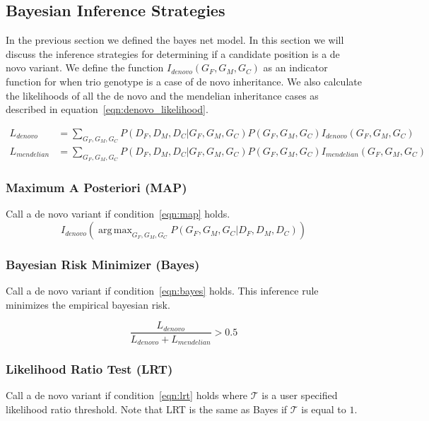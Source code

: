 \documentclass{article}
\DeclareMathOperator*{\argmax}{arg\,max}
\begin{document}
\subsection{Bayesian Inference Strategies}
In the previous section we defined the bayes net model. In this section we will discuss the inference strategies for determining if a candidate position is a de novo variant. We define the function $I_{denovo}(G_F,G_M,G_C)$ as an indicator function for when trio genotype is a case of de novo inheritance. We also calculate the likelihoods of all the de novo and the mendelian inheritance cases as described in equation~\ref{eqn:denovo_likelihood}.

\begin{align*}
\label{eqn:denovo_likelihood}
L_{denovo} &= \sum_{G_F,G_M,G_C}P(D_F,D_M,D_C|G_F,G_M,G_C)P(G_F,G_M,G_C)I_{denovo}(G_F,G_M,G_C)\\
L_{mendelian} &= \sum_{G_F,G_M,G_C}P(D_F,D_M,D_C|G_F,G_M,G_C)P(G_F,G_M,G_C)I_{mendelian}(G_F,G_M,G_C)
\end{align*}

\vspace{1em}
\subsubsection{Maximum A Posteriori (MAP)} 
Call a de novo variant if condition~\ref{eqn:map} holds.
\begin{equation}
\label{eqn:map}
I_{denovo}(\argmax_{G_F,G_M,G_C} P(G_F,G_M,G_C|D_F,D_M,D_C))
\end{equation}

\subsubsection{Bayesian Risk Minimizer (Bayes)} 
Call a de novo variant if condition~\ref{eqn:bayes} holds. This inference rule minimizes the empirical bayesian risk.

\begin{equation}
\label{eqn:bayes}
\frac{L_{denovo}}{L_{denovo} + L_{mendelian}} > 0.5
\end{equation}

\subsubsection{Likelihood Ratio Test (LRT)} 
Call a de novo variant if condition~\ref{eqn:lrt} holds where $\mathcal{T}$ is a user specified likelihood ratio threshold. Note that LRT is the same as Bayes if $\mathcal{T}$ is equal to $1$.
\end{document}
